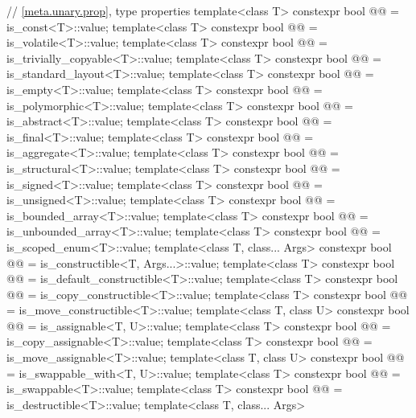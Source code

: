 \begin{codeblock}
{  // \ref{meta.unary.prop}, type properties
  template<class T>
    constexpr bool @@ = is_const<T>::value;
  template<class T>
    constexpr bool @@ = is_volatile<T>::value;
  template<class T>
    constexpr bool @@ = is_trivially_copyable<T>::value;
  template<class T>
    constexpr bool @@ = is_standard_layout<T>::value;
  template<class T>
    constexpr bool @@ = is_empty<T>::value;
  template<class T>
    constexpr bool @@ = is_polymorphic<T>::value;
  template<class T>
    constexpr bool @@ = is_abstract<T>::value;
  template<class T>
    constexpr bool @@ = is_final<T>::value;
  template<class T>
    constexpr bool @@ = is_aggregate<T>::value;
  template<class T>
    constexpr bool @@ = is_structural<T>::value;
  template<class T>
    constexpr bool @@ = is_signed<T>::value;
  template<class T>
    constexpr bool @@ = is_unsigned<T>::value;
  template<class T>
    constexpr bool @@ = is_bounded_array<T>::value;
  template<class T>
    constexpr bool @@ = is_unbounded_array<T>::value;
  template<class T>
    constexpr bool @@ = is_scoped_enum<T>::value;
  template<class T, class... Args>
    constexpr bool @@ = is_constructible<T, Args...>::value;
  template<class T>
    constexpr bool @@ = is_default_constructible<T>::value;
  template<class T>
    constexpr bool @@ = is_copy_constructible<T>::value;
  template<class T>
    constexpr bool @@ = is_move_constructible<T>::value;
  template<class T, class U>
    constexpr bool @@ = is_assignable<T, U>::value;
  template<class T>
    constexpr bool @@ = is_copy_assignable<T>::value;
  template<class T>
    constexpr bool @@ = is_move_assignable<T>::value;
  template<class T, class U>
    constexpr bool @@ = is_swappable_with<T, U>::value;
  template<class T>
    constexpr bool @@ = is_swappable<T>::value;
  template<class T>
    constexpr bool @@ = is_destructible<T>::value;
  template<class T, class... Args>
}
\end{codeblock}
